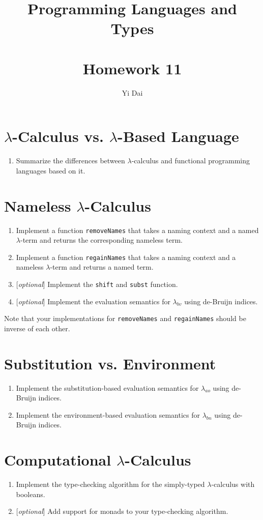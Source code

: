\documentclass[a4paper,12pt]{article}
\title{
 Programming Languages and Types \\~\\
 \textbf{Homework 11}
}
\author{
 Yi Dai
}
\begin{document}
\maketitle


\section{$\lambda$-Calculus vs. $\lambda$-Based Language}

\begin{enumerate}
 \item Summarize the differences between $\lambda$-calculus and functional programming
	languages based on it.
\end{enumerate}

\section{Nameless $\lambda$-Calculus}

\begin{enumerate}
 \item Implement a function \verb|removeNames| that takes a naming context and a named
  $\lambda$-term and returns the	corresponding nameless term.
 \item Implement a function \verb|regainNames| that takes a naming context and a nameless
  $\lambda$-term and returns a named term.
 \item{} [\emph{optional}] Implement the \verb|shift| and \verb|subst| function.
 \item{} [\emph{optional}] Implement the evaluation semantics for $\lambda_{bv}$ using
  de-Bruijn indices.
\end{enumerate}

\noindent
Note that your implementations for \verb|removeNames| and \verb|regainNames| should be
inverse of each other.

\section{Substitution vs. Environment}

\begin{enumerate}
 \item Implement the substitution-based evaluation semantics for $\lambda_{ao}$ using
  de-Bruijn indices.
 \item Implement the environment-based evaluation semantics for $\lambda_{bn}$ using
  de-Bruijn indices.
\end{enumerate}

\section{Computational $\lambda$-Calculus}

\begin{enumerate}
 \item Implement the type-checking algorithm for the simply-typed $\lambda$-calculus
  with booleans.
 \item{} [\emph{optional}] Add support for monads to your type-checking algorithm.
\end{enumerate}
\end{document}
